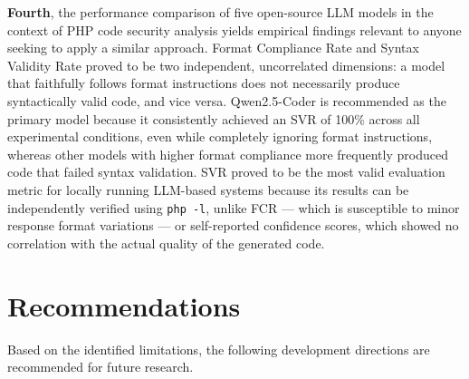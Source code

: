 \textbf{Fourth}, the performance comparison of five open-source 
LLM models in the context of PHP code security analysis yields 
empirical findings relevant to anyone seeking to apply a similar 
approach. Format Compliance Rate and Syntax Validity Rate proved 
to be two independent, uncorrelated dimensions: a model that 
faithfully follows format instructions does not necessarily 
produce syntactically valid code, and vice versa. Qwen2.5-Coder 
is recommended as the primary model because it consistently 
achieved an SVR of 100\% across all experimental conditions, 
even while completely ignoring format instructions, whereas other 
models with higher format compliance more frequently produced 
code that failed syntax validation. SVR proved to be the most 
valid evaluation metric for locally running LLM-based systems 
because its results can be independently verified using 
\texttt{php -l}, unlike FCR --- which is susceptible to minor 
response format variations --- or self-reported confidence 
scores, which showed no correlation with the actual quality of 
the generated code.

\section{Recommendations}

Based on the identified limitations, the following development 
directions are recommended for future research.

